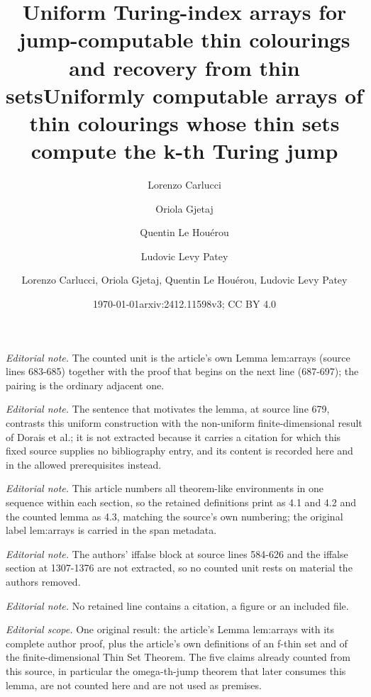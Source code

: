 \documentclass{article}
\title{Uniform Turing-index arrays for jump-computable thin colourings and recovery from thin sets}
\date{\today}
\author{Lorenzo Carlucci \and Oriola Gjetaj \and Quentin Le Houérou \and Ludovic Levy Patey}
\title{Uniformly computable arrays of thin colourings whose thin sets compute the k-th Turing jump}
\author{Lorenzo Carlucci, Oriola Gjetaj, Quentin Le Houérou, Ludovic Levy Patey}
\date{arxiv:2412.11598v3; CC BY 4.0}
\numberwithin{theorem}{section}
\begin{document}
\maketitle
\setcounter{section}{4}
\setcounter{theorem}{0}
\noindent\textit{Editorial note.} The counted unit is the article's own Lemma lem:arrays (source lines 683-685) together with the proof that begins on the next line (687-697); the pairing is the ordinary adjacent one.\par\medskip
\noindent\textit{Editorial note.} The sentence that motivates the lemma, at source line 679, contrasts this uniform construction with the non-uniform finite-dimensional result of Dorais et al.; it is not extracted because it carries a citation for which this fixed source supplies no bibliography entry, and its content is recorded here and in the allowed prerequisites instead.\par\medskip
\noindent\textit{Editorial note.} This article numbers all theorem-like environments in one sequence within each section, so the retained definitions print as 4.1 and 4.2 and the counted lemma as 4.3, matching the source's own numbering; the original label lem:arrays is carried in the span metadata.\par\medskip
\noindent\textit{Editorial note.} The authors' iffalse block at source lines 584-626 and the iffalse section at 1307-1376 are not extracted, so no counted unit rests on material the authors removed.\par\medskip
\noindent\textit{Editorial note.} No retained line contains a citation, a figure or an included file.\par\medskip
\noindent\textit{Editorial scope.} One original result: the article's Lemma lem:arrays with its complete author proof, plus the article's own definitions of an f-thin set and of the finite-dimensional Thin Set Theorem. The five claims already counted from this source, in particular the omega-th-jump theorem that later consumes this lemma, are not counted here and are not used as premises.\par\medskip
\end{document}
